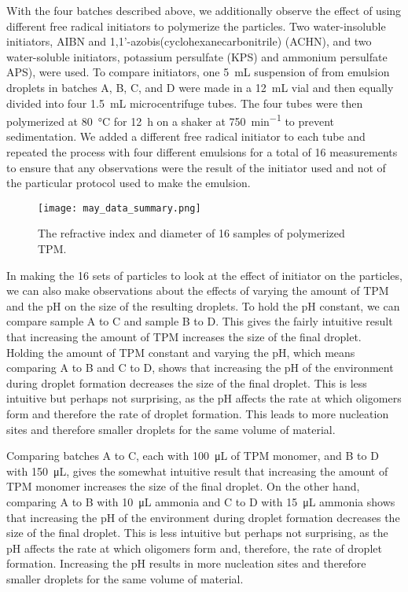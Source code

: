 
With the four batches described above, we additionally observe the effect of using
different free radical initiators to polymerize the particles.
Two water-insoluble initiators, AIBN and
\num{1},\num{1}'-azobis(cyclohexanecarbonitrile) (ACHN), and two water-soluble 
initiators, potassium persulfate (KPS) and ammonium persulfate APS), were 
used. To compare initiators, one \SI{5}{\milli \liter} suspension of from emulsion droplets
in batches A, B, C, and D were 
made in a \SI{12}{\milli \liter} vial and then equally divided into four %
\SI{1.5}{\milli \liter} microcentrifuge tubes.
The four tubes were then polymerized at \SI{80}{\celsius} 
for \SI{12}{\hour} on a shaker at \SI{750}{\minute^{-1}} %
to prevent sedimentation.
We added a different free radical initiator to each tube and repeated the process with four
different emulsions for a total of 
\num{16} measurements to ensure that any observations were the result of the 
initiator used and not of the particular protocol used to make the emulsion.

\begin{figure}
    \centering
    \texttt{[image: may\_data\_summary.png]}
    \caption{The refractive index and diameter of 16 samples of 
    polymerized TPM.}
    \label{fig:initiator_data}
\end{figure}

In making the \si{16} sets of particles to look at the effect of initiator on 
the particles, we can also make observations about the effects of varying 
the amount of TPM and the pH on the size of the resulting droplets. To hold 
the pH constant, we can compare sample A to C and sample B to D. This gives 
the fairly intuitive result that increasing the amount of TPM increases the 
size of the final droplet. Holding the amount of TPM constant and varying 
the pH, which means comparing A to B and C to D, shows that increasing the 
pH of the environment during droplet formation decreases the size of the 
final droplet. This is less intuitive but perhaps not surprising, as the pH 
affects the rate at which oligomers form and therefore the rate of droplet 
formation. This leads to more nucleation sites and therefore smaller droplets 
for the same volume of material. 

Comparing batches A to C, each with \SI{100}{\micro \liter} of TPM monomer, and B to D with
\SI{150}{\micro \liter}, gives the somewhat intuitive result that increasing the amount of TPM
monomer increases the size of the final droplet. On the other hand, comparing A to B with
\SI{10}{\micro \liter} ammonia and C to D with \SI{15}{\micro \liter} ammonia shows that
increasing the pH of the environment during droplet formation decreases the size of the 
final droplet. This is less intuitive but perhaps not surprising, as the pH 
affects the rate at which oligomers form and, therefore, the rate of droplet 
formation. Increasing the pH results in more nucleation sites and therefore smaller droplets 
for the same volume of material. 


